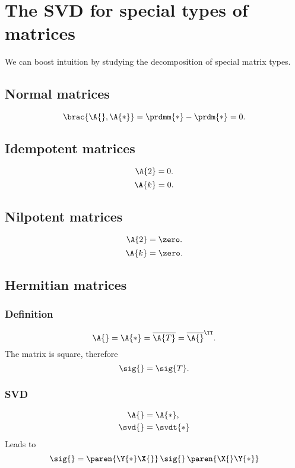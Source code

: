 \section[Special types]{The SVD for special types of matrices}
We can boost intuition by studying the decomposition of special matrix types.

\subsection{Normal matrices}
\begin{equation}
  \brac{\A{},\A{*}} = \prdmm{*} - \prdm{*} = 0.
\end{equation}

\subsection{Idempotent matrices}
\begin{equation}
  \A{2} = 0.
\end{equation}
\begin{equation}
  \A{k} = 0.
\end{equation}

\subsection{Nilpotent matrices}
\begin{equation}
  \A{2} = \zero.
\end{equation}
\begin{equation}
  \A{k} = \zero.
\end{equation}

\subsection{Hermitian matrices}
\subsubsection{Definition}
\begin{equation}
  \A{} = \A{*} = \overline{ \A{T} } = \overline{\A{}}^{\TT}.
\end{equation}
The matrix is square, therefore 
\begin{equation}
  \sig{} = \sig{T}.
\end{equation}
\subsubsection{SVD}
\begin{equation}
  \begin{split}
     \A{} &= \A{*}, \\
     \svd{} &= \svdt{*}
  \end{split}
\end{equation}
Leads to
\begin{equation}
  \sig{} = \paren{\Y{*}\X{}} \, \sig{} \, \paren{\X{}\Y{*}}
\end{equation}


